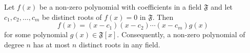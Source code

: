 Let $f(x)$ be a non-zero polynomial with coefficients in a field $\mathfrak{F}$ and let $c_1, c_2, \ldots, c_m$ be distinct roots of $f(x) = 0$ in $\mathfrak{F}$. Then
$$f(x) = (x - c_1)(x - c_2)\cdots(x - c_m)g(x)$$
for some polynomial $g(x) \in \mathfrak{F}[x]$. Consequently, a non-zero polynomial of degree $n$ has at most $n$ distinct roots in any field.
